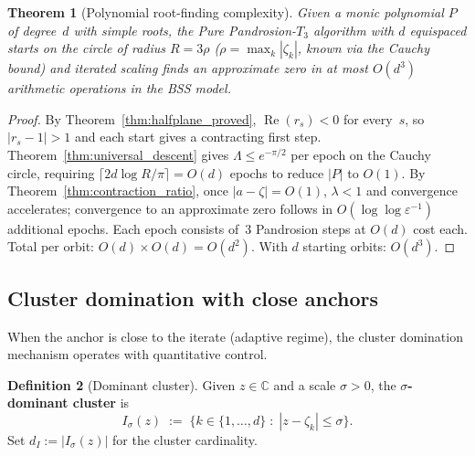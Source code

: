 \documentclass[10pt,a4paper,oneside]{book}
\newtheorem{theorem}{Theorem}[chapter]
\theoremstyle{definition}
\newtheorem{definition}[theorem]{Definition}
\theoremstyle{remark}
\newcommand{\CC}{\mathbb{C}}
\begin{document}
\begin{theorem}[Polynomial root-finding complexity]
\label{thm:main}
Given a monic polynomial $P$ of degree~$d$ with simple roots, the Pure Pandrosion-$T_3$ algorithm with $d$ equispaced starts on the circle of radius $R = 3\rho$ ($\rho = \max_k|\zeta_k|$, known via the Cauchy bound) and iterated scaling finds an approximate zero in at most $O(d^3)$ arithmetic operations in the BSS model.
\end{theorem}

\begin{proof}
By Theorem~\ref{thm:halfplane_proved}, $\operatorname{Re}(r_s) < 0$ for every~$s$, so $|r_s - 1| > 1$ and each start gives a contracting first step.  Theorem~\ref{thm:universal_descent} gives $\Lambda \leq e^{-\pi/2}$ per epoch on the Cauchy circle, requiring $\lceil 2d\log R/\pi\rceil = O(d)$ epochs to reduce $|P|$ to $O(1)$.  By Theorem~\ref{thm:contraction_ratio}, once $|a-\zeta| = O(1)$, $\lambda < 1$ and convergence accelerates; convergence to an approximate zero follows in $O(\log\log\varepsilon^{-1})$ additional epochs.  Each epoch consists of~$3$ Pandrosion steps at $O(d)$ cost each.  Total per orbit: $O(d) \times O(d) = O(d^2)$.  With $d$ starting orbits: $O(d^3)$.
\end{proof}

\subsection{Cluster domination with close anchors}
\label{sec:cluster_domination}

When the anchor is close to the iterate (adaptive regime), the cluster domination mechanism operates with quantitative control.

\begin{definition}[Dominant cluster]
\label{def:dominant_cluster}
Given $z \in \CC$ and a scale $\sigma > 0$, the \textbf{$\sigma$-dominant cluster} is
\[
  I_\sigma(z) \;:=\; \bigl\{k \in \{1,\ldots,d\} \;:\; |z - \zeta_k| \leq \sigma\bigr\}.
\]
Set $d_I := |I_\sigma(z)|$ for the cluster cardinality.
\end{definition}
\end{document}
